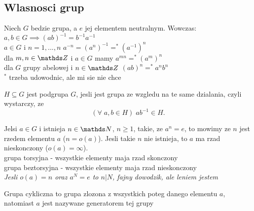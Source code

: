 \subsection{Wlasnosci grup}
\begin{multicols}{2}

    Niech $G$ bedzie grupa, a $e$ jej elementem neutralnym. Wowczas:\smallskip\\
    \point $a,b\in G\implies (ab)^{-1}=b^{-1}a^{-1}$\smallskip\\
    \point $a\in G$ i $n=1, ..., n$ $a^{-n} = (a^n)^{-1} =^* (a^{-1})^n$\smallskip\\
    \point dla $m,n\in\Z$ i $a\in G$ mamy $a^{mn}=^* (a^m)^n$\smallskip\\
    \point dla $G$ grupy abelowej i $n\in\Z$ $(ab)^n=^*a^nb^n$\smallskip\\
    $^*$ trzeba udowodnic, ale mi sie nie chce\medskip

    $H\subseteq G$ jest {\color{def}podgrupa} $G$, jesli jest grupa ze wzgledu na te same dzialania, czyli wystarczy, ze 
    $$(\forall\;a,b\in H)\; ab^{-1}\in H.$$

    \medskip

    Jelsi $a\in G$ i istnieja $n\in\N$, $n\geq 1$, takie, ze $a^n=e$, to mowimy ze $n$ jest {\color{def}rzedem elementu} $a$ ($n=o(a)$). Jesli takie $n$ nie istnieja, to $a$ ma {\color{acc}rzad nieskonczony} ($o(a)=\infty$).\smallskip\\
    {\color{acc}\point} {\color{def}grupa torsyjna} - wszystkie elementy maja rzad skonczony\smallskip\\
    {\color{acc}\point} {\color{def}grupa beztorsyjna} - wszystkie elementy maja rzad nieskonczony\smallskip\\
    \emph{Jesli $o(a) = n$ oraz $a^N=e$ to $n|N$, fajny dowodzik, ale leniem jestem}\medskip

    {\color{def}Grupa cykliczna} to grupa zlozona z wszystkich poteg danego elementu $a$, natomiast $a$ jest nazywane {\color{acc}generatorem} tej grupy

\end{multicols}

\bigskip

